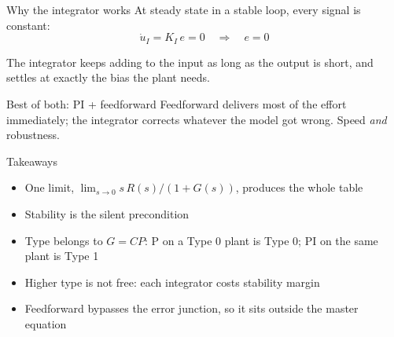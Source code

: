 \documentclass[aspectratio=169,12pt]{beamer}
\begin{document}
\begin{frame}{Why the integrator works}
  At steady state in a stable loop, every signal is constant:
  \[
    \dot u_I = K_I\, e = 0 \quad\Longrightarrow\quad e = 0
  \]

  The integrator keeps adding to the input as long as the output is short, and settles at exactly the bias the plant needs.

  \bigskip
  \begin{block}{Best of both: PI + feedforward}
    Feedforward delivers most of the effort immediately; the integrator corrects whatever the model got wrong. Speed \emph{and} robustness.
  \end{block}
\end{frame}

\begin{frame}{Takeaways}
  \begin{itemize}
    \item One limit, $\lim_{s\to 0} s\,R(s)/(1+G(s))$, produces the whole table
    \item Stability is the silent precondition
    \item Type belongs to $G = CP$: P on a Type 0 plant is Type 0; PI on the same plant is Type 1
    \item Higher type is not free: each integrator costs stability margin
    \item Feedforward bypasses the error junction, so it sits outside the master equation
  \end{itemize}
\end{frame}
\end{document}
